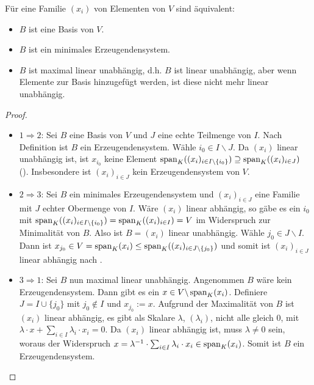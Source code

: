 \begin{proposition}
	Für eine Familie $(x_i)$ von Elementen von $V$ sind äquivalent:
	\begin{itemize}
		\item $B$ ist eine Basis von $V$.
		\item $B$ ist ein minimales Erzeugendensystem.
		\item $B$ ist maximal linear unabhängig, d.h. $B$ ist linear unabhängig, aber wenn Elemente zur Basis 
		hinzugefügt werden, ist diese nicht mehr linear unabhängig.
	\end{itemize}
\end{proposition}
\begin{proof}
	\begin{itemize}
		\item $1 \Rightarrow 2$: Sei $B$ eine Basis von $V$ und $J$ eine echte Teilmenge von $I$. Nach Definition ist $B$ ein 
		Erzeugendensystem. Wähle $i_0 \in I\backslash J$. Da $(x_i)$ linear unabhängig ist, ist $x_{i_0}$ keine Element 
		$\operatorname{span}_K((x_i)_{i \in I\backslash \{i_0\}}) \supseteq \operatorname{span}_K((x_i)_{i \in J})$ (). Insbesondere ist $(x_i)_{i\in J}$ kein 
		Erzeugendensystem von $V$. 
		\item $2 \Rightarrow 3$: Sei $B$ ein minimales Erzeugendensystem und $(x_i)_{i \in J}$ eine Familie mit $J$ echter 
		Obermenge von $I$. Wäre $(x_i)$ linear abhängig, so gäbe es ein $i_0$ mit $\operatorname{span}_K((x_i)_{i \in I\backslash 
			\{i_0\}}) = \operatorname{span}_K((x_i)_{i \in I})=V$ im Widerspruch zur Minimalität von $B$. Also ist $B=(x_i)$ linear 
		unabhängig. Wähle $j_0 \in J\backslash I$. Dann ist $x_{j_0} \in V=\operatorname{span}_K(x_i) \le \operatorname{span}_K((x_i)_{i \in 
			J\backslash \{j_0\}})$ und somit ist $(x_i)_{i\in J}$ linear abhängig nach .
		\item $3 \Rightarrow 1$: Sei $B$ nun maximal linear unabhängig. Angenommen $B$ wäre kein Erzeugendensystem. 
		Dann gibt es ein $x\in V \backslash \operatorname{span}_K(x_i)$. Definiere $J=I \cup \{j_0\}$ mit $j_0 \notin I$ und $x_{j_0}:=x$. 
		Aufgrund der Maximalität von $B$ ist $(x_i)$ linear abhängig, es gibt als Skalare $\lambda$, $(\lambda_i)$, nicht 
		alle gleich 0, mit $\lambda\cdot x+\sum_{i \in I} \lambda_i\cdot x_i=0$. Da $(x_i)$ linear abhängig ist, 
		muss $\lambda \neq 0$ sein, woraus der Widerspruch $x=\lambda^{-1}\cdot\sum_{i \in I} \lambda_i\cdot x_i 
		\in \operatorname{span}_K(x_i)$. Somit ist $B$ ein Erzeugendensystem.
	\end{itemize}
\end{proof}

